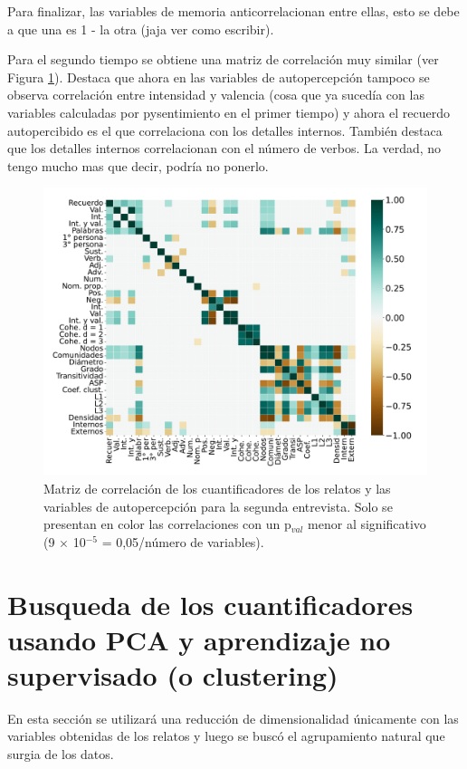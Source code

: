Para finalizar, las variables de memoria anticorrelacionan entre ellas, esto se debe a que una es 1 - la otra (jaja ver como escribir).


Para el segundo tiempo se obtiene una matriz de correlación muy similar (ver Figura \ref{fig:cap3_corrsegt}). Destaca que ahora en las variables de autopercepción tampoco se observa correlación entre intensidad y valencia (cosa que ya sucedía con las variables calculadas por pysentimiento en el primer tiempo) y ahora el recuerdo autopercibido es el que correlaciona con los detalles internos. También destaca que los detalles internos correlacionan con el número de verbos. La verdad, no tengo mucho mas que decir, podría no ponerlo.



\begin{figure}[h]
    \centering
    \includegraphics[width = 15cm]{figures/ch03/Correlacion/2correlacion_Segunda.pdf} 
    \caption{Matriz de correlación de los cuantificadores de los relatos y las variables de autopercepción para la segunda entrevista. Solo se presentan en color las correlaciones con un p$_{val}$ menor al significativo (9 $\times$ 10$^{-5}$ = 0,05/número de variables).}
\label{fig:cap3_corrsegt}
\end{figure}

\section{Busqueda de los cuantificadores usando PCA y aprendizaje no supervisado (o clustering)}

En esta sección se utilizará una reducción de dimensionalidad únicamente con las variables obtenidas de los relatos y luego se buscó el agrupamiento natural que surgia de los datos.

